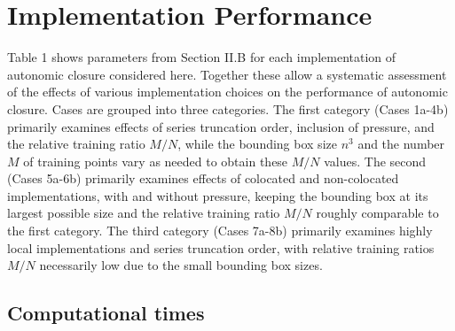 \graphicspath{ {./Ch5/}  } 

\chapter{Implementation Performance}

Table 1 shows parameters from Section II.B for each implementation of autonomic closure considered here. Together these allow a systematic assessment of the effects of various implementation choices on the performance of autonomic closure. Cases are grouped into three categories. The first category (Cases 1a-4b) primarily examines effects of series truncation order, inclusion of pressure, and the relative training ratio $M/N$, while the bounding box size $n^3$ and the number $M$ of training points vary as needed to obtain these  $M/N$ values. The second (Cases 5a-6b) primarily examines effects of colocated and non-colocated implementations, with and without pressure, keeping the bounding box at its largest possible size and the relative training ratio  $M/N$ roughly comparable to the first category. The third category (Cases 7a-8b) primarily examines highly local implementations and series truncation order, with relative training ratios $M/N$  necessarily low due to the small bounding box sizes. 

\section{Computational times} 

